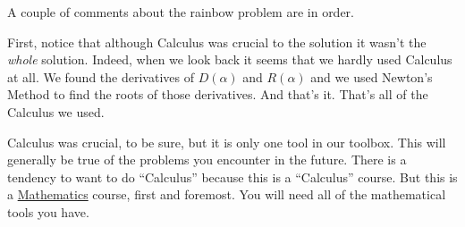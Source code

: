 A couple of comments about the rainbow problem are in order.

First, notice that although Calculus was crucial to the solution it wasn't
the \emph{whole} solution. Indeed, when we look back it seems that we
hardly used Calculus at all. We found the derivatives of $D(\alpha)$
and  $R(\alpha)$ and we used Newton's Method to find the roots of those
derivatives. And that's it. That's all of the Calculus we used.

Calculus was crucial, to be sure, but it is only one tool in our
toolbox. This will generally be true of the problems you encounter in
the future. There is a tendency to want to do ``Calculus'' because
this is a ``Calculus'' course. But this is a \underline{Mathematics}
course, first and foremost. You will need all of the mathematical
tools you have. 




